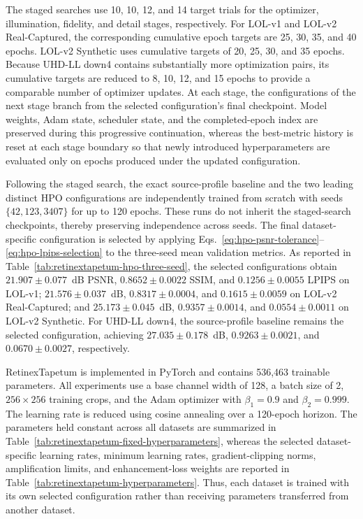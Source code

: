 The staged searches use 10, 10, 12, and 14 target trials for the optimizer,
illumination, fidelity, and detail stages, respectively. For LOL-v1 and LOL-v2
Real-Captured, the corresponding cumulative epoch targets are 25, 30, 35, and
40 epochs. LOL-v2 Synthetic uses cumulative targets of 20, 25, 30, and 35
epochs. Because UHD-LL down4 contains substantially more optimization pairs,
its cumulative targets are reduced to 8, 10, 12, and 15 epochs to provide a
comparable number of optimizer updates. At each stage, the configurations of
the next stage branch from the selected configuration's final checkpoint.
Model weights, Adam state, scheduler state, and the completed-epoch index are
preserved during this progressive continuation, whereas the best-metric
history is reset at each stage boundary so that newly introduced
hyperparameters are evaluated only on epochs produced under the updated
configuration.



Following the staged search, the exact source-profile baseline and the two
leading distinct HPO configurations are independently trained from scratch
with seeds $\{42,123,3407\}$ for up to 120 epochs. These runs do not inherit
the staged-search checkpoints, thereby preserving independence across seeds.
The final dataset-specific configuration is selected by applying
Eqs.~\eqref{eq:hpo-psnr-tolerance}--\eqref{eq:hpo-lpips-selection} to the
three-seed mean validation metrics. As reported in
Table~\ref{tab:retinextapetum-hpo-three-seed}, the selected configurations
obtain $21.907\pm0.077$~dB PSNR, $0.8652\pm0.0022$ SSIM, and
$0.1256\pm0.0055$ LPIPS on LOL-v1; $21.576\pm0.037$~dB,
$0.8317\pm0.0004$, and $0.1615\pm0.0059$ on LOL-v2 Real-Captured;
and $25.173\pm0.045$~dB, $0.9357\pm0.0014$, and
$0.0554\pm0.0011$ on LOL-v2 Synthetic. For UHD-LL down4, the
source-profile baseline remains the selected configuration, achieving
$27.035\pm0.178$~dB, $0.9263\pm0.0021$, and
$0.0670\pm0.0027$, respectively.

RetinexTapetum is implemented in PyTorch and contains 536,463 trainable
parameters. All experiments use a base channel width of 128, a batch size of
2, $256\times256$ training crops, and the Adam optimizer with
$\beta_1=0.9$ and $\beta_2=0.999$. The learning rate is reduced using cosine
annealing over a 120-epoch horizon. The parameters held constant across all
datasets are summarized in
Table~\ref{tab:retinextapetum-fixed-hyperparameters}, whereas the selected
dataset-specific learning rates, minimum learning rates, gradient-clipping
norms, amplification limits, and enhancement-loss weights are reported in
Table~\ref{tab:retinextapetum-hyperparameters}. Thus, each dataset is trained
with its own selected configuration rather than receiving parameters
transferred from another dataset.

